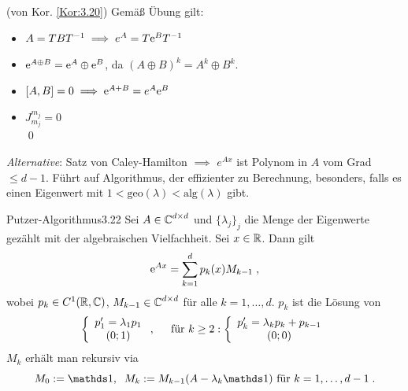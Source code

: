 \documentclass[a4paper]{article}
\begin{document}
\begin{Beweis}
(von Kor. \ref{Kor:3.20}) Gemäß Übung gilt:
\begin{itemize}
\item $A=TBT^{-1}\implies e^A=T\mathrm{e}^BT^{-1}$
\item $\mathrm{e}^{A\oplus B}=\mathrm{e}^{A}\oplus\mathrm{e}^{B}$, da $(A\oplus B)^k=A^k\oplus B^k$.
\item $[A,B]=0\implies \mathrm{e}^{A+B}=e^{A}\mathrm{e}^{B}$
\item $J_{m_j}^{m_j}=0$\\\qed
\end{itemize}
\end{Beweis}

\textit{Alternative}: Satz von Caley-Hamilton $\implies$ $e^{Ax}$ ist Polynom in $A$ vom Grad $\le d-1$. Führt auf Algorithmus, der effizienter zu Berechnung, besonders, falls es einen Eigenwert mit $1<\mathrm{geo}(\lambda)<\mathrm{alg}(\lambda)$ gibt.

\begin{Satz}{Putzer-Algorithmus}{3.22}
Sei $A\in \operatorname{\mathbb C}^{d\times d}$ und $\{\lambda_j\}_j$ die Menge der Eigenwerte gezählt mit der algebraischen Vielfachheit. Sei $x\in\mathbb R$. Dann gilt
\[\mathrm{e}^{Ax}=\sum_{k=1}^dp_k(x)M_{k-1}\;,\]
wobei $p_k\in C^1(\mathbb R,\operatorname{\mathbb C})$, $M_{k-1}\in\operatorname{\mathbb C}^{d\times d}$ für alle $k=1,\ldots,d$. $p_k$ ist die Lösung von
\[\left\{\begin{array}{c}
p_1'=\lambda_1  p_1\\(0;1)
\end{array}\right.
,\;\;\;\;\text{ für }k\ge 2:\left\{\begin{array}{c}
p_k'=\lambda_kp_k+p_{k-1}\\
(0;0)
\end{array}\right.\]
$M_k$ erhält man rekursiv via
\[M_0:=\mathds 1,\;\;M_k:=M_{k-1}(A-\lambda_k\mathds 1)\te{für }k=1,\ldots,d-1\;.\]
\end{Satz}
\end{document}
